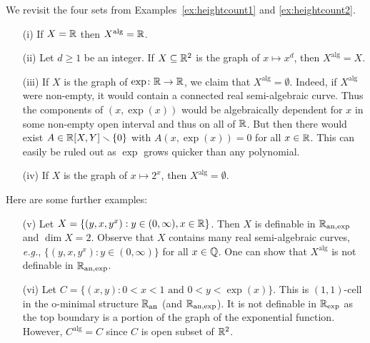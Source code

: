 \begin{example}
  We revisit the four sets from Examples~\ref{ex:heightcount1} and
  \ref{ex:heightcount2}.
  \begin{enumerate}
  \item [(i)] If $X={\mathbb{R}}$ then $X^{\mathrm{alg}}={\mathbb{R}}$.
  \item[(ii)] Let $d\ge 1$ be an integer. If
    $X\subseteq{\mathbb{R}}^2$ is the graph of $x\mapsto x^d$, then
    $X^{\mathrm{alg}}=X$.
  \item[(iii)] If $X$ is the graph of $\exp\colon{\mathbb{R}}\rightarrow{\mathbb{R}}$, we
    claim that $X^{\mathrm{alg}}=\emptyset$. Indeed, if
    $X^{\mathrm{alg}}$ were non-empty, it would contain a connected
    real semi-algebraic curve. Thus the components of $(x,\exp(x))$
    would be algebraically dependent for $x$ in some non-empty open
    interval and thus on all of ${\mathbb{R}}$. But then there would exist
    $A\in {\mathbb{R}}[X,Y]\smallsetminus\{0\}$ with $A(x,\exp(x))=0$ for all $x\in{\mathbb{R}}$.
    This can easily be ruled out as $\exp$
    grows quicker than any polynomial. 
    
  \item[(iv)] If $X$ is the graph of $x\mapsto 2^x$, then
    $X^{\mathrm{alg}}=\emptyset$.    
  \end{enumerate}
  Here are some further examples:
  \begin{enumerate}
  \item [(v)] Let $X = \{(y,x,y^x) : y\in (0,\infty), x\in{\mathbb{R}}\}$. Then
    $X$ is definable in ${{\mathbb{R}}_{\mathrm{an,exp}}}$ and $\dim X = 2$.
    Observe that $X$ contains many real semi-algebraic curves,
    \textit{e.g.}, $\{(y,x,y^x) : y\in (0,\infty)\}$ for all
    $x\in{\mathbb{Q}}$.
    One can show that $X^{\mathrm{alg}}$ is not definable in
    ${{\mathbb{R}}_{\mathrm{an,exp}}}$.

  \item[(vi)] Let $C = \{(x,y) : 0<x<1 \text{ and } 0<y<\exp(x) \}$.
    This is $(1,1)$-cell in the o-minimal structure ${{\mathbb{R}}_{\mathrm{an}}}$ (and
    ${{\mathbb{R}}_{\mathrm{an,exp}}}$). It is not definable in ${{\mathbb{R}}_{\mathrm{exp}}}$ as the top boundary
    is a portion of the graph of the exponential function. However,
    $C^{\mathrm{alg}}=C$ since $C$ is open subset of ${\mathbb{R}}^2$. 
  \end{enumerate}
\end{example}



